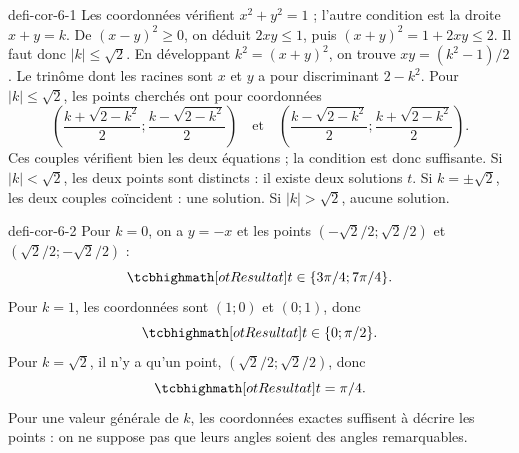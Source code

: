\begin{blocEdition}{defi-cor-6-1}
Les coordonnées vérifient $x^2+y^2=1$ ; l'autre condition est la droite $x+y=k$.
De $(x-y)^2\geq0$, on déduit $2xy\leq1$, puis
$(x+y)^2=1+2xy\leq2$. Il faut donc $|k|\leq\sqrt2$.
En développant $k^2=(x+y)^2$, on trouve $xy=(k^2-1)/2$.
Le trinôme dont les racines sont $x$ et $y$ a pour discriminant $2-k^2$.
Pour $|k|\leq\sqrt2$, les points cherchés ont pour coordonnées
\[\left(\frac{k+\sqrt{2-k^2}}2;\frac{k-\sqrt{2-k^2}}2\right)
\quad\text{et}\quad
\left(\frac{k-\sqrt{2-k^2}}2;\frac{k+\sqrt{2-k^2}}2\right).\]
Ces couples vérifient bien les deux équations ; la condition est donc suffisante.
Si $|k|<\sqrt2$, les deux points sont distincts : il existe deux solutions $t$.
Si $k=\pm\sqrt2$, les deux couples coïncident : une solution.
Si $|k|>\sqrt2$, aucune solution.
\end{blocEdition}

\begin{blocEdition}{defi-cor-6-2}
Pour $k=0$, on a $y=-x$ et les points
$(-\sqrt2/2;\sqrt2/2)$ et $(\sqrt2/2;-\sqrt2/2)$ :
\[\res{t\in\{3\pi/4;7\pi/4\}}.\]
Pour $k=1$, les coordonnées sont $(1;0)$ et $(0;1)$, donc
\[\res{t\in\{0;\pi/2\}}.\]
Pour $k=\sqrt2$, il n'y a qu'un point, $(\sqrt2/2;\sqrt2/2)$, donc
\[\res{t=\pi/4}.\]
Pour une valeur générale de $k$, les coordonnées exactes suffisent à décrire les points :
on ne suppose pas que leurs angles soient des angles remarquables.
\label{figedition-defi-cor-6-2-1}
\end{blocEdition}

